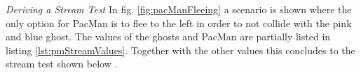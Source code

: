 \emph{Deriving a Stream Test} \newline
In fig. \ref{fig:pacManFleeing} a scenario is shown where the only option for PacMan is to flee to the left in order to not collide with the pink and blue ghost. The values of the ghosts and PacMan are partially listed in listing \ref{lst:pmStreamValues}. Together with the other values this concludes to the stream test shown below .
\begin{figure}[!h]
	\centering

\end{figure}
